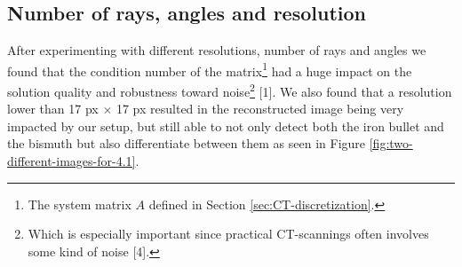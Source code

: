\documentclass{article}
\begin{document}
\subsection{Number of rays, angles and resolution}\label{sec:num-rays-angles-resolution} 
After experimenting with different resolutions, number of rays and angles we found that the condition number of the matrix\footnote{The system matrix $A$ defined in Section \ref{sec:CT-discretization}.} had a huge impact on the solution quality and robustness toward noise\footnote{Which is especially important since practical CT-scannings often involves some kind of noise [4].} [1]. 
We also found that a resolution lower than 17 px $\times$ 17 px resulted in the reconstructed image being very impacted by our setup, but still able to not only detect both the iron bullet and the bismuth but also differentiate between them as seen in Figure \ref{fig:two-different-images-for-4.1}. 
\end{document}
